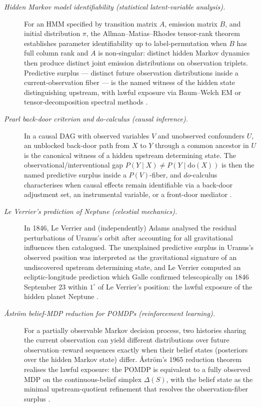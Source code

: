 \documentclass[11pt]{article}
\theoremstyle{definition}
\begin{document}
\begin{description}
\item[\emph{Hidden Markov model identifiability (statistical
latent-variable analysis).}]
For an HMM specified by transition matrix \(A\), emission matrix
\(B\), and initial distribution \(\pi\), the Allman--Matias--Rhodes
tensor-rank theorem establishes parameter identifiability up to
label-permutation when \(B\) has full column rank and \(A\) is
non-singular: distinct hidden Markov dynamics then produce distinct
joint emission distributions on observation triplets.  Predictive
surplus --- distinct future observation distributions inside a
current-observation fiber --- is the named witness of the hidden
state distinguishing upstream, with lawful exposure via Baum--Welch
EM or tensor-decomposition spectral methods
\citep{AllmanMatiasRhodes2009Identifiability}.

\item[\emph{Pearl back-door criterion and \(do\)-calculus (causal
inference).}]
In a causal DAG with observed variables \(V\) and unobserved
confounders \(U\), an unblocked back-door path from \(X\) to \(Y\)
through a common ancestor in \(U\) is the canonical witness of a
hidden upstream determining state.  The observational/interventional
gap \(P(Y\mid X)\ne P(Y\mid \mathrm{do}(X))\) is then the named
predictive surplus inside a \(P(V)\)-fiber, and \(do\)-calculus
characterises when causal effects remain identifiable via a
back-door adjustment set, an instrumental variable, or a front-door
mediator
\citep{Pearl1995CausalDiagrams}.

\item[\emph{Le Verrier's prediction of Neptune (celestial
mechanics).}]
In 1846, Le Verrier and (independently) Adams analysed the residual
perturbations of Uranus's orbit after accounting for all
gravitational influences then catalogued.  The unexplained
predictive surplus in Uranus's observed position was interpreted as
the gravitational signature of an undiscovered upstream determining
state, and Le Verrier computed an ecliptic-longitude prediction
which Galle confirmed telescopically on 1846 September 23 within
\(1^\circ\) of Le Verrier's position: the lawful exposure of the
hidden planet Neptune
\citep{LeVerrier1846RecherchesUranus}.

\item[\emph{{\AA}str{\"o}m belief-MDP reduction for {POMDPs}
(reinforcement learning).}]
For a partially observable Markov decision process, two histories
sharing the current observation can yield different distributions
over future observation--reward sequences exactly when their belief
states (posteriors over the hidden Markov state) differ.
{\AA}str{\"o}m's 1965 reduction theorem realises the lawful exposure:
the POMDP is equivalent to a fully observed MDP on the
continuous-belief simplex \(\Delta(S)\), with the belief state as
the minimal upstream-quotient refinement that resolves the
observation-fiber surplus
\citep{Astrom1965OptimalControlIncomplete}.


\end{description}
\end{document}
